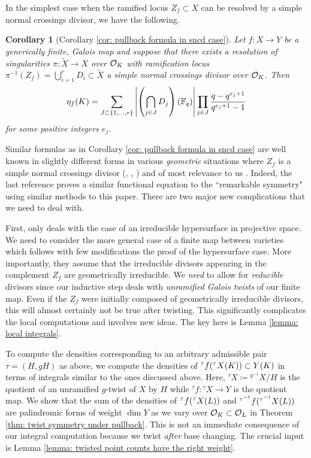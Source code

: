 \documentclass[10pt]{article}
\theoremstyle{plain}
\newtheorem{corollary}[theorem]{Corollary}
\theoremstyle{definition}
\numberwithin{equation}{section}
\begin{document}
In the simplest case when the ramified locus $Z_f \subset X$ can be resolved by a simple normal crossings divisor, we have the following.

\begin{corollary}[Corollary \ref{cor: pullback formula in sncd case}]
Let $f: X \to Y$ be a generically finite, Galois map and suppose that there exists a resolution of singularities $\pi: \widetilde{X} \to X$ over ${{\mathcal O}_{K}}$ with  ramification locus $\pi^{-1}(Z_f) = \bigcup_{i=1}^r D_i \subset \tilde{X}$ a simple normal crossings divisor over ${{\mathcal O}_{K}}$. Then
\[\eta_f(K) = \sum_{J \subset \{1,\dots,r\}}\left|\left(\bigcap_{j\in J}D_j\right)(\mathbb F_{q})\right|\prod_{j\in J}\frac{q - q^{e_j+1}}{q^{e_j+1}-1}\]
for some positive integers $e_j$.
\end{corollary}

Similar formulas as in Corollary \ref{cor: pullback formula in sncd case} are well known in slightly different forms in various \emph{geometric} situations where $Z_f$ is a simple normal crossings divisor (\cite[Proposition 4.11]{yasuda2017wild}, \cite[Theorem 2.3.2]{denef1992caracteristiques}, \cite[Theorem 2.8.1]{loeser2009seattle}) and of most relevance to us \cite[Theorem 3]{denef1991functional}. Indeed, the last reference proves a similar functional equation to the ``remarkable symmetry" using similar methods to this paper. There are two major new complications that we need to deal with.

First, \cite{denef1991functional} only deals with the case of an irreducible hypersurface in projective space. We need to consider the more general case of a finite map between varieties which follows with few modifications the proof of the hypersurface case. More importantly, they assume that the irreducible divisors appearing in the complement $Z_f$ are geometrically irreducible. We \emph{need} to allow for \emph{reducible} divisors since our inductive step deals with \emph{unramified Galois twists} of our finite map. Even if the $Z_f$ were initially composed of geometrically irreducible divisors, this will almost certainly not be true after twisting. This significantly complicates the local computations and involves new ideas. The key here is Lemma \ref{lemma: local integrals}.

To compute the densities corresponding to an arbitrary admissible pair $\tau = (H,gH)$ as above, we compute the densities of ${^\tau f}({^\tau X}(K)) \subset Y(K)$ in terms of integrals similar to the ones discussed above. Here, ${^\tau X} \coloneqq  {^{g^{-1}} X}/H$ is the quotient of an unramified $g$-twist of $X$ by $H$  while $ {^\tau f}: {^\tau X} \to Y$ is the quotient map. We show that the sum of the densities of ${^\tau f}({^\tau X}({L}))$ and $ {^{\tau^{-1}} f}({{^{\tau^{-1}}} X}({L}))$ are palindromic forms of weight $\dim Y$ as we vary over ${{\mathcal O}_{K}} \subset { {\mathcal O} _{L}}$ in Theorem \ref{thm: twist symmetry under pullback}. This is not an immediate consequence of our integral computation because we twist \emph{after} base changing. The crucial input is Lemma \ref{lemma: twisted point counts have the right weight}.
\end{document}
